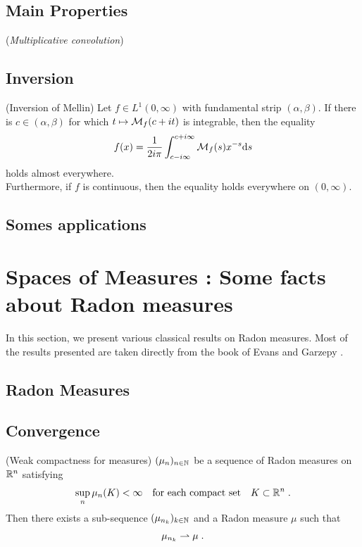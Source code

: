 \documentclass[11pt]{amsart}
\begin{document}
\subsection{Main Properties}

\begin{proposition}(\textit{Multiplicative convolution})
    
\end{proposition}

\subsection{Inversion}

\begin{theorem}(Inversion of Mellin)
    Let $f \in L^1(0, \infty)$ with fundamental strip $(\alpha, \beta)$. If there is $c \in (\alpha, \beta)$ for which $t \mapsto \mathcal{M}_f(c + it)$ is integrable, then the equality 
        \begin{equation}
            f(x) = \frac{1}{2i\pi} \int_{c - i \infty}^{c + i \infty} \mathcal{M}_f(s)x^{-s}\mathrm ds
        \end{equation}
    holds almost everywhere. \\
    Furthermore, if $f$ is continuous, then the equality holds everywhere on $(0, \infty)$.
    \label{Th:Mellin_inversion}
\end{theorem}

\subsection{Somes applications}

\section{Spaces of Measures : Some facts about Radon measures}
In this section, we present various classical results on Radon measures.
Most of the results presented are taken directly from the book of Evans and Garzepy \cite{evans2018measure}. 
    \subsection{Radon Measures}
    
\subsection{Convergence}

\begin{theorem}(Weak compactness for measures) $(\mu_n)_{n \in \mathbb{N}}$ be a sequence of Radon measures on $\mathbb{R}^n$ satisfying 
    \begin{equation*}
        \sup_{n} \mu_n(K) < \infty 
        \quad \text{for each compact set} \quad
        K \subset \mathbb{R}^n
        \; .
    \end{equation*}
    Then there exists a sub-sequence $(\mu_{n_k})_{k \in \mathbb{N}}$ and a Radon measure $\mu$ such that
        \begin{equation*}
            \mu_{n_k} \rightharpoonup \mu
            \; .
        \end{equation*}
\end{theorem}
    
\end{document}
